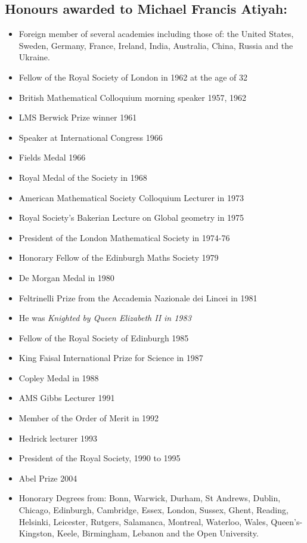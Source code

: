 \documentclass[12pt]{article}
\theoremstyle{plain}
\theoremstyle{definition}
\numberwithin{equation}{section}
\begin{document}
\subsection{Honours awarded to Michael Francis Atiyah:}
\begin{itemize}
\item Foreign member of several academies including those of:  the United States, Sweden, Germany, France, Ireland, India, Australia, China, Russia and the Ukraine.
\item Fellow of the Royal Society of London in 1962 at the age of 32
\item British Mathematical Colloquium morning speaker 1957, 1962  
\item LMS Berwick Prize winner 1961 
\item Speaker at International Congress 1966  
\item Fields Medal 1966
\item Royal Medal of the Society in 1968
\item American Mathematical Society Colloquium Lecturer in 1973
\item Royal Society's Bakerian Lecture on Global geometry in 1975
\item President of the London Mathematical Society in 1974-76
\item Honorary Fellow of the Edinburgh Maths Society 1979
\item De Morgan Medal in 1980
\item Feltrinelli Prize from the Accademia Nazionale dei Lincei in 1981
\item He was \emph{Knighted by Queen Elizabeth II in 1983}
\item Fellow of the Royal Society of Edinburgh 1985   
\item King Faisal International Prize for Science in 1987
\item Copley Medal in 1988 
\item AMS Gibbs Lecturer 1991  
\item Member of the Order of Merit in 1992
\item Hedrick lecturer 1993  
\item President of the Royal Society, 1990 to 1995
\item Abel Prize 2004 
\item Honorary Degrees from: Bonn, Warwick, Durham, St Andrews, Dublin, Chicago, Edinburgh, Cambridge, Essex, London, Sussex, Ghent, Reading, Helsinki, Leicester, Rutgers, Salamanca, Montreal, Waterloo, Wales, Queen's-Kingston, Keele, Birmingham, Lebanon and the Open University.
\end{itemize}
\end{document}
